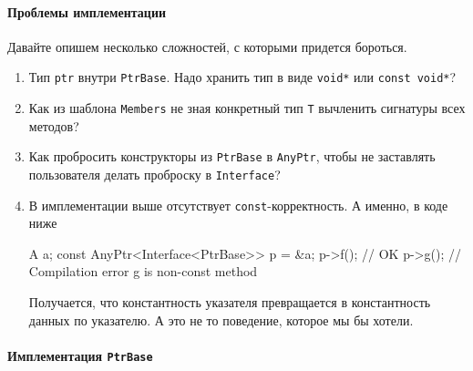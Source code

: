\paragraph{Проблемы имплементации}

Давайте опишем несколько сложностей, с которыми придется бороться.
\begin{enumerate}
\item Тип \verb"ptr" внутри \verb"PtrBase".
Надо хранить тип в виде \verb"void*" или \verb"const void*"?

\item Как из шаблона \verb"Members" не зная конкретный тип \verb"T" вычленить сигнатуры всех методов?

\item Как пробросить конструкторы из \verb"PtrBase" в \verb"AnyPtr", чтобы не заставлять пользователя делать проброску в \verb"Interface"?

\item В имплементации выше отсутствует \verb"const"-корректность.
А именно, в коде ниже
\begin{cppcode}
A a;
const AnyPtr<Interface<PtrBase>> p = &a;
p->f(); // OK
p->g(); // Compilation error g is non-const method
\end{cppcode}
Получается, что константность указателя превращается в константность данных по указателю.
А это не то поведение, которое мы бы хотели.
\end{enumerate}

\paragraph{Имплементация \texttt{PtrBase}}

